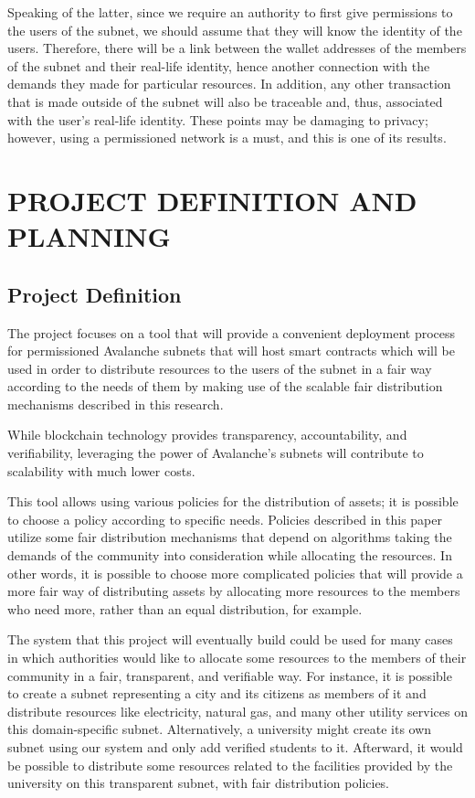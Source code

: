 \documentclass[a4paper,12pt]{report}
\begin{document}
Speaking of the latter, since we require an authority to first give permissions to the users of the subnet, we should assume that they will know the identity of the users. Therefore, there will be a link between the wallet addresses of the members of the subnet and their real-life identity, hence another connection with the demands they made for particular resources. In addition, any other transaction that is made outside of the subnet will also be traceable and, thus, associated with the user’s real-life identity. These points may be damaging to privacy; however, using a permissioned network is a must, and this is one of its results.
\chapter{PROJECT DEFINITION AND PLANNING}
\section{Project Definition}
The project focuses on a tool that will provide a convenient deployment process for permissioned Avalanche subnets that will host smart contracts which will be used in order to distribute resources to the users of the subnet in a fair way according to the needs of them by making use of the scalable fair distribution mechanisms described in this research.

While blockchain technology provides transparency, accountability, and verifiability, leveraging the power of Avalanche’s subnets will contribute to scalability with much lower costs.

This tool allows using various policies for the distribution of assets; it is possible to choose a policy according to specific needs. Policies described in this paper utilize some fair distribution mechanisms that depend on algorithms taking the demands of the community into consideration while allocating the resources. In other words, it is possible to choose more complicated policies that will provide a more fair way of distributing assets by allocating more resources to the members who need more, rather than an equal distribution, for example.

\newpage

The system that this project will eventually build could be used for many cases in which authorities would like to allocate some resources to the members of their community in a fair, transparent, and verifiable way. For instance, it is possible to create a subnet representing a city and its citizens as members of it and distribute resources like electricity, natural gas, and many other utility services on this domain-specific subnet. Alternatively, a university might create its own subnet using our system and only add verified students to it. Afterward, it would be possible to distribute some resources related to the facilities provided by the university on this transparent subnet, with fair distribution policies. 
\end{document}
